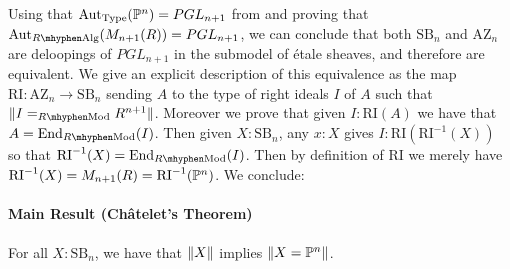 \documentclass{../util/zariski}
\newcommand{\SB}{\mathrm{SB}}
\newcommand{\RI}{\mathrm{RI}}
\newcommand{\AZ}{\mathrm{AZ}}
\begin{document}
Using that $\mathrm{Aut}_{\mathrm{Type}}(\mathbb{P}^n) = PGL_{n+1}$ from \cite{sag-projective} and proving that $\mathrm{Aut}_{R\mhyphen\mathrm{Alg}}(M_{n+1}(R)) = PGL_{n+1}$,
we can conclude that both $\SB_n$ and $\AZ_n$ are deloopings of $PGL_{n+1}$ in the submodel of étale sheaves, and therefore are equivalent. We give an explicit description of this equivalence as the map $\RI:\AZ_n\to\SB_n$ sending $A$ to the type of right ideals $I$ of $A$ such that $\propTrunc{I=_{R\mhyphen\mathrm{Mod}}R^{n+1}}$. Moreover we prove that given $I:\RI(A)$ we have that $A = \mathrm{End}_{R\mhyphen\mathrm{Mod}}(I)$. Then given $X:\SB_n$, any $x:X$ gives $I:\RI(\RI^{-1}(X))$ so that $\RI^{-1}(X) = \mathrm{End}_{R\mhyphen\mathrm{Mod}}(I)$. Then by definition of $\RI$ we merely have $\RI^{-1}(X) = M_{n+1}(R)=\RI^{-1}(\bP^n)$. We conclude: 
\paragraph{Main Result (Ch\^atelet's Theorem)} For all $X:\SB_n$, we have that $\lVert X \rVert$ implies $\lVert X=\mathbb{P}^n \rVert$.

\printindex
\printbibliography
\end{document}
